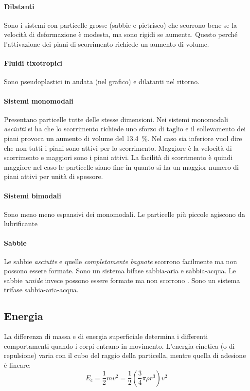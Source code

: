 \documentclass[a5paper,12pt]{article}
\begin{document}
\paragraph{Dilatanti} Sono i sistemi con particelle grosse (sabbie e pietrisco) che scorrono bene se la velocità di deformazione è modesta, ma sono rigidi se aumenta. Questo perché l'attivazione dei piani di scorrimento richiede un aumento di volume.
\paragraph{Fluidi tixotropici} Sono pseudoplastici in andata (nel grafico) e dilatanti nel ritorno.
\paragraph{Sistemi monomodali} Presentano particelle tutte delle stesse dimensioni.
Nei sistemi monomodali \emph{asciutti} si ha che lo scorrimento richiede uno sforzo di taglio e il sollevamento dei piani provoca un aumento di volume del \SI{13.4}{\%}. Nel caso sia inferiore vuol dire che non tutti i piani sono attivi per lo scorrimento. Maggiore è la velocità di scorrimento e maggiori sono i piani attivi. La facilità di scorrimento è quindi maggiore nel caso le particelle siano fine in quanto si ha un maggior numero di piani attivi per unità di spessore.
\paragraph{Sistemi bimodali} Sono meno meno espansivi dei monomodali. Le particelle più piccole agiscono da lubrificante
\paragraph{Sabbie} Le sabbie \emph{asciutte} e quelle \emph{completamente bagnate} scorrono facilmente ma non possono essere formate. Sono un sistema bifase sabbia-aria e sabbia-acqua. Le sabbie \emph{umide} invece possono essere formate ma non scorrono . Sono un sistema trifase sabbia-aria-acqua.
\subsection{Energia}
La differenza di massa e di energia superficiale determina i differenti comportamenti quando i corpi entrano in movimento. L'energia cinetica (o di repulsione) varia con il cubo del raggio della particella, mentre quella di adesione è lineare:
\[E_c = \frac{1}{2}m v^2 = \frac{1}{2}\left( \frac{3}{4} \pi \rho r^3 \right)v^2\]
\end{document}
